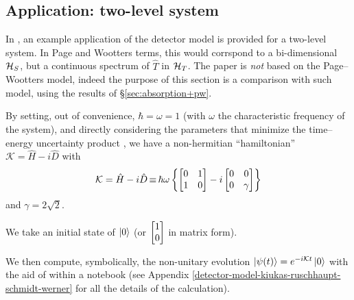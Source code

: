 

\subsection{Application: two-level system}

In \cite{RuschhauptAbsorption}, an example application of the detector model
is provided for a two-level system.
In Page and Wootters terms,
this would corrspond to a bi-dimensional $\mathcal{H}_S$, but a continuous
spectrum of $\hat{T}$ in $\mathcal{H}_T$. The paper is \emph{not} based on
the Page--Wootters model, indeed the purpose of this section is a comparison
with such model, using the results of \S \ref{sec:absorption+pw}.

By setting, out of convenience, $\hbar = \omega = 1$
(with $\omega$ the characteristic frequency of the system),
and directly considering the parameters
that minimize the time--energy uncertainty product \parencite{RuschhauptAbsorption},
we have a non-hermitian ``hamiltonian''
$\mathcal{K} = \hat{H} - i\hat{D}$ with
\begin{equation}\label{eq:complexpot}
  \mathcal{K} = \hat{H} - i\hat{D} \operatorname*{\equiv}
    \hbar\omega\left\{
      \left[\begin{matrix}0 & 1\\1 & 0\end{matrix}\right] -
      i \left[\begin{matrix}0 & 0\\0 & \gamma \end{matrix}\right]
    \right\}
\end{equation}
and $\gamma = 2\sqrt{2}$.

We take an initial state of $\ket{0}$
(or $\mqty[1\\0]$ in matrix form).

We then compute, symbolically, the non-unitary evolution
$\ket{\psi(t)} = e^{-i\mathcal{K}t}\ket{0}$
with the aid of  \parencite{comp:sympy} within a  \parencite{comp:jupyter} notebook
(see Appendix \ref{detector-model-kiukas-ruschhaupt-schmidt-werner} for all the details of the calculation).

